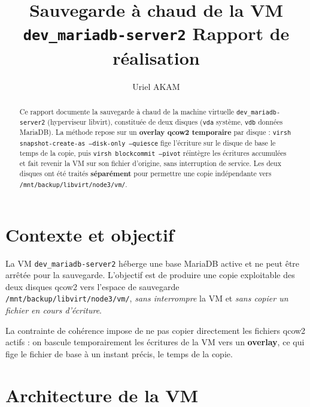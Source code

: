 \documentclass{csbulletin}
\begin{document}
\title{Sauvegarde à chaud de la VM \texttt{dev\_mariadb-server2} Rapport de réalisation}
\author{Uriel AKAM}
\maketitle
\renewcommand{\figurename}{Figure}
\renewcommand{\tablename}{Tableau}

\begin{abstract}
Ce rapport documente la sauvegarde à chaud de la machine virtuelle
\nolinkurl{dev_mariadb-server2} (hyperviseur libvirt), constituée de deux
disques (\texttt{vda} système, \texttt{vdb} données MariaDB). La méthode repose
sur un \textbf{overlay qcow2 temporaire} par disque : \texttt{virsh
snapshot-create-as --disk-only --quiesce} fige l'écriture sur le disque de base
le temps de la copie, puis \texttt{virsh blockcommit --pivot} réintègre les
écritures accumulées et fait revenir la VM sur son fichier d'origine, sans
interruption de service. Les deux disques ont été traités \textbf{séparément}
pour permettre une copie indépendante vers \nolinkurl{/mnt/backup/libvirt/node3/vm/}.
\end{abstract}


\section{Contexte et objectif}

La VM \texttt{dev\_mariadb-server2} héberge une base MariaDB active et ne peut
être arrêtée pour la sauvegarde. L'objectif est de produire une copie
exploitable des deux disques qcow2 vers l'espace de sauvegarde
\nolinkurl{/mnt/backup/libvirt/node3/vm/}, \emph{sans interrompre} la VM et
\emph{sans copier un fichier en cours d'écriture}.

La contrainte de cohérence impose de ne pas copier directement les fichiers
qcow2 actifs : on bascule temporairement les écritures de la VM vers un
\textbf{overlay}, ce qui fige le fichier de base à un instant précis, le temps
de la copie.


\section{Architecture de la VM}
\end{document}
